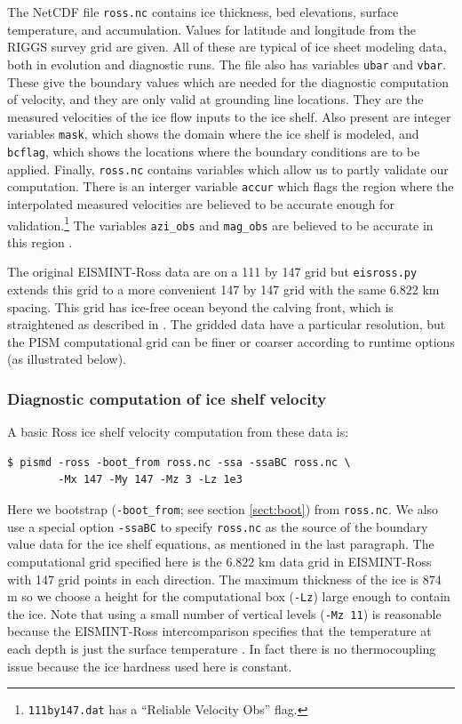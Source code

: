\documentclass[11pt,final]{amsart}
\begin{document}
The NetCDF file \verb|ross.nc| contains ice thickness, bed elevations, surface temperature, and accumulation.  Values for latitude and longitude from the RIGGS survey grid \cite{RIGGS1} are given.  All of these are typical of ice sheet modeling data, both in evolution and diagnostic runs.  The file also has variables \verb|ubar| and \verb|vbar|.  These give the boundary values which are needed for the diagnostic computation of velocity, and they are only valid at grounding line locations.  They are the measured velocities of the ice flow inputs to the ice shelf.  Also present are integer variables \verb|mask|, which shows the domain where the ice shelf is modeled, and \verb|bcflag|, which shows the locations where the boundary conditions are to be applied.  Finally, \verb|ross.nc| contains variables which allow us to partly validate our computation.  There is an interger variable \verb|accur| which flags the region where the interpolated measured velocities are believed to be accurate enough for validation.\footnote{\texttt{111by147.dat} has a ``Reliable Velocity Obs'' flag.}  The variables \verb|azi_obs| and \verb|mag_obs| are believed to be accurate in this region \cite{MacAyealetal}.

The original EISMINT-Ross data are on a 111 by 147 grid but \verb|eisross.py| extends this grid to a more convenient 147 by 147 grid with the same $6.822$ km spacing.  This grid has ice-free ocean beyond the calving front, which is straightened as described in \cite{MacAyealetal}.  The gridded data have a particular resolution, but the PISM computational grid can be finer or coarser according to runtime options (as illustrated below).

\subsubsection*{Diagnostic computation of ice shelf velocity}  A basic Ross ice shelf velocity computation from these data is:

\begin{verbatim}
$ pismd -ross -boot_from ross.nc -ssa -ssaBC ross.nc \
        -Mx 147 -My 147 -Mz 3 -Lz 1e3
\end{verbatim}
Here we bootstrap (\verb|-boot_from|; see section \ref{sect:boot}) from \verb|ross.nc|.  We also use a special option \verb|-ssaBC| to specify \verb|ross.nc| as the source of the boundary value data for the ice shelf equations, as mentioned in the last paragraph.  The computational grid specified here is the $6.822$ km data grid in EISMINT-Ross with 147 grid points in each direction.  The maximum thickness of the ice is 874 m so we choose a height for the computational box (\verb|-Lz|) large enough to contain the ice.  Note that using a small number of vertical levels (\verb|-Mz 11|) is reasonable because the EISMINT-Ross intercomparison specifies that the temperature at each depth is just the surface temperature \cite{MacAyealetal}.  In fact there is no thermocoupling issue because the ice hardness used here is constant.
\end{document}
